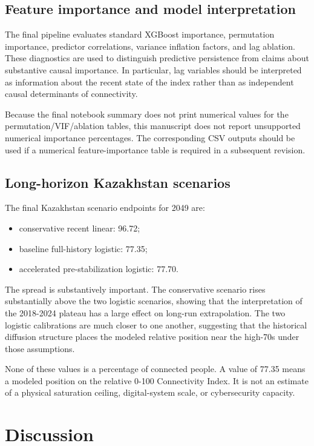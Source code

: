 \documentclass[conference]{IEEEtran}
\begin{document}
\subsection{Feature importance and model interpretation}

The final pipeline evaluates standard XGBoost importance, permutation importance, predictor correlations, variance inflation factors, and lag ablation. These diagnostics are used to distinguish predictive persistence from claims about substantive causal importance. In particular, lag variables should be interpreted as information about the recent state of the index rather than as independent causal determinants of connectivity.

Because the final notebook summary does not print numerical values for the permutation/VIF/ablation tables, this manuscript does not report unsupported numerical importance percentages. The corresponding CSV outputs should be used if a numerical feature-importance table is required in a subsequent revision.

\subsection{Long-horizon Kazakhstan scenarios}

The final Kazakhstan scenario endpoints for 2049 are:
\begin{itemize}
\item conservative recent linear: 96.72;
\item baseline full-history logistic: 77.35;
\item accelerated pre-stabilization logistic: 77.70.
\end{itemize}

The spread is substantively important. The conservative scenario rises substantially above the two logistic scenarios, showing that the interpretation of the 2018-2024 plateau has a large effect on long-run extrapolation. The two logistic calibrations are much closer to one another, suggesting that the historical diffusion structure places the modeled relative position near the high-70s under those assumptions.

None of these values is a percentage of connected people. A value of 77.35 means a modeled position on the relative 0-100 Connectivity Index. It is not an estimate of a physical saturation ceiling, digital-system scale, or cybersecurity capacity.

\section{Discussion}
\end{document}
